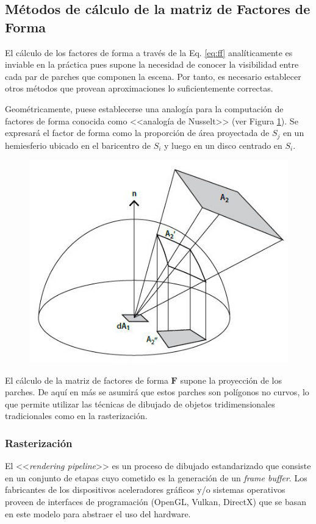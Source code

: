 \subsection{Métodos de cálculo de la matriz de Factores de Forma}
\label{sec:calculoff}

El cálculo de los factores de forma a través de la Eq. \eqref{eq:ff} analíticamente es inviable en la práctica pues supone la necesidad de conocer la visibilidad entre cada par de parches que componen la escena. Por tanto, es necesario establecer otros métodos que provean aproximaciones lo suficientemente correctas.

Geométricamente, puese establecerse una analogía para la computación de factores de forma conocida como <<analogía de Nusselt>> (ver Figura \ref{img:nusselt}). Se expresará el factor de forma como la proporción de área proyectada de $S_{j}$ en un hemiesferio ubicado en el baricentro de $S_{i}$ y luego en un disco centrado en $S_{i}$.

\begin{figure}[H]
	\centering
	\includegraphics[width=0.55\linewidth]{assets/nusselt}
	\label{img:nusselt}
\end{figure}

El cálculo de la matriz de factores de forma $\mathbf{F}$ supone la proyección de los parches. De aquí en más se asumirá que estos parches son polígonos no curvos, lo que permite utilizar las técnicas de dibujado de objetos tridimensionales tradicionales como en la rasterización.

\subsubsection{Rasterización}
\label{sec:rasterizacion}

El <<\textit{rendering pipeline}>> es un proceso de dibujado estandarizado que consiste en un conjunto de etapas cuyo cometido es la generación de un \textit{frame buffer}. Los fabricantes de los dispositivos aceleradores gráficos y/o sistemas operativos proveen de interfaces de programación (OpenGL, Vulkan, DirectX) que se basan en este modelo para abstraer el uso del hardware.

